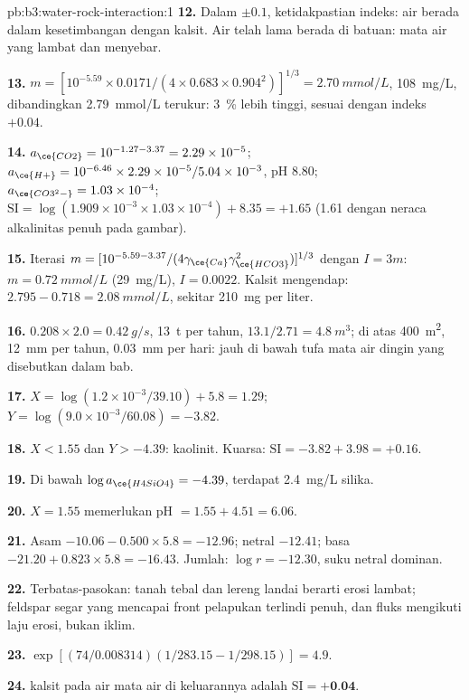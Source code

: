 \begin{solution}{pb:b3:water-rock-interaction:1}
\textbf{12.} Dalam $\pm0.1$, ketidakpastian indeks: air berada dalam
kesetimbangan dengan kalsit. Air telah lama berada di batuan: mata air yang
lambat dan menyebar.

\textbf{13.} $m = [10^{-5.59}\times0.0171/(4\times0.683\times0.904^2)]^{1/3}
= \qty{2.70}{mmol/L}$, \qty{108}{mg/L}, dibandingkan \qty{2.79}{mmol/L} terukur:
\qty{3}{\percent} lebih tinggi, sesuai dengan indeks $+0.04$.

\textbf{14.} $a_{\ce{CO2}} = 10^{-1.27 - 3.37} = 2.29\times10^{-5}$;
$a_{\ce{H+}} = 10^{-6.46}\times2.29\times10^{-5}/5.04\times10^{-3}$, pH 8.80;
$a_{\ce{CO3^2-}} = 1.03\times10^{-4}$; $\mathrm{SI} = \log(1.909\times
10^{-3}\times1.03\times10^{-4}) + 8.35 = +1.65$ (1.61 dengan
neraca alkalinitas penuh pada gambar).

\textbf{15.} Iterasi $m = [10^{-5.59 - 3.37}/(4\gamma_{\ce{Ca}}
\gamma_{\ce{HCO3}}^2)]^{1/3}$ dengan $I = 3m$: $m = \qty{0.72}{mmol/L}$
(\qty{29}{mg/L}), $I = 0.0022$. Kalsit mengendap: $2.795 - 0.718 =
\qty{2.08}{mmol/L}$, sekitar \qty{210}{mg} per liter.

\textbf{16.} $0.208\times2.0 = \qty{0.42}{g/s}$, \qty{13}{t} per tahun,
$13.1/2.71 = \qty{4.8}{m^3}$; di atas \qty{400}{m^2}, \qty{12}{mm} per tahun,
\qty{0.03}{mm} per hari: jauh di bawah tufa mata air dingin yang disebutkan dalam bab.

\textbf{17.} $X = \log(1.2\times10^{-3}/39.10) + 5.8 = 1.29$; $Y =
\log(9.0\times10^{-3}/60.08) = -3.82$.

\textbf{18.} $X < 1.55$ dan $Y > -4.39$: kaolinit. Kuarsa: $\mathrm{SI} =
-3.82 + 3.98 = +0.16$.

\textbf{19.} Di bawah $\log a_{\ce{H4SiO4}} = -4.39$, terdapat \qty{2.4}{mg/L}
silika.

\textbf{20.} $X = 1.55$ memerlukan pH $= 1.55 + 4.51 = 6.06$.

\textbf{21.} Asam $-10.06 - 0.500\times5.8 = -12.96$; netral $-12.41$; basa
$-21.20 + 0.823\times5.8 = -16.43$. Jumlah: $\log r = -12.30$, suku netral
dominan.

\textbf{22.} Terbatas-pasokan: tanah tebal dan lereng landai berarti erosi lambat;
feldspar segar yang mencapai front pelapukan terlindi penuh, dan
fluks mengikuti laju erosi, bukan iklim.

\textbf{23.} $\exp[(74/0.008314)(1/283.15 - 1/298.15)] = 4.9$.

\textbf{24.}  kalsit pada air mata air di keluarannya
adalah $\mathrm{SI} = \textbf{+0.04}$.
\end{solution}
